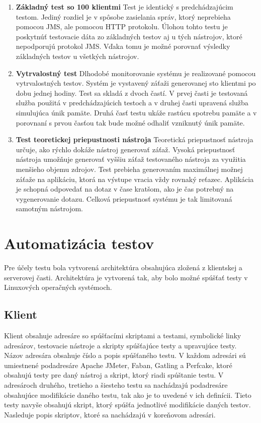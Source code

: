 \documentclass[12pt,oneside,final]{fithesis-utf8}
\begin{document}
\begin{enumerate}
\item \textbf{Základný test so 100 klientmi}
\newline
Test je identický s predchádzajúcim testom. Jediný rozdiel je v spôsobe zasielania správ, ktorý neprebieha pomocou JMS, ale pomocou HTTP protokolu. Úlohou tohto testu je poskytnúť testovacie dáta zo základných testov aj u tých nástrojov, ktoré nepodporujú protokol JMS. Vďaka tomu je možné porovnať výsledky základných testov u všetkých nástrojov.
\newline

\item \textbf{Vytrvalostný test}
\newline
Dlhodobé monitorovanie systému je realizované pomocou vytrvalostných testov. Systém je vystavený záťaži generovanej sto klientmi po dobu jednej hodiny. Test sa skladá z dvoch častí. V prvej časti je testovaná služba použitá v predchádzajúcich testoch a v druhej časti upravená služba simulujúca únik pamäte. Druhá časť testu ukáže rastúcu spotrebu pamäte a v porovnaní s prvou časťou tak bude možné odhaliť vzniknutý únik pamäte.
\newline

\item \textbf{Test teoretickej priepustnosti nástroja}
\newline
Teoretická priepustnosť nástroja určuje, ako rýchlo dokáže nástroj generovať záťaž. Vysoká priepustnosť nástroja umožňuje generovať vyššiu záťaž testovaného nástroja za využitia menšieho objemu zdrojov. Test prebieha generovaním maximálnej možnej záťaže na aplikáciu, ktorá na výstupe vracia vždy rovnaký reťazec. Aplikácia je schopná odpovedať na dotaz v čase kratšom, ako je čas potrebný na vygenerovanie dotazu. Celková priepustnosť systému je tak limitovaná samotným nástrojom.

\end{enumerate}

\newpage
\section{Automatizácia testov}
Pre účely testu bola vytvorená architektúra obsahujúca zložená z klientskej a serverovej časti. Architektúra je vytvorená tak, aby bolo možné spúšťať testy v Linuxových operačných systémoch.

\subsection{Klient}
Klient obsahuje adresáre so spúšťacími skriptami a testami, symbolické linky adresárov, testovacie nástroje a skripty spúšťajúce testy a upravujúce testy. Názov adresára obsahuje číslo a popis spúšťaného testu. V každom adresári sú umiestnené podadresáre Apache JMeter, Faban, Gatling a Perfcake, ktoré obsahujú testy pre daný nástroj a skript, ktorý riadi spúštanie testu. V adresároch druhého, tretieho a šiesteho testu sa nachádzajú podadresáre obsahujúce modifikácie daného testu, tak ako je to uvedené v ich definícii. Tieto testy navyše obsahujú skript, ktorý spúšťa jednotlivé modifikácie daných testov. Nasleduje popis skriptov, ktoré sa nachádzajú v koreňovom adresári.	
\end{document}
